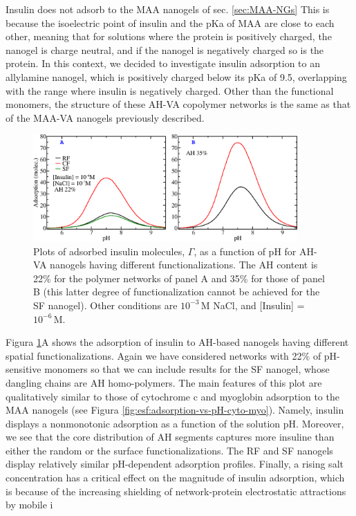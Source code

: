{Insulin does not adsorb to the MAA nanogels of sec.  \ref{sec:MAA-NGs} %
This is because the isoelectric point of insulin and the pKa of MAA are close to each other, meaning that for solutions where the protein is positively charged, the nanogel is charge neutral, and if the nanogel is negatively charged so is the protein.
In this context, we decided to investigate insulin adsorption to an allylamine nanogel, which is positively charged below its pKa of 9.5, overlapping with the range where insulin is negatively charged.
Other than the functional monomers, the structure of these AH-VA copolymer networks is the same as that of the MAA-VA nanogels previously described.



\begin{figure}[!htb]
    \centering
    \includegraphics[width=0.9\textwidth]{Figures/graphs-gel2/insu-PAH.png}
    \caption{Plots of adsorbed insulin molecules, $\Gamma$, as a function of pH for  AH-VA nanogels having different functionalizations.
    The AH content is 22\% for the polymer networks of panel A and 35\% for those of panel B (this latter degree of functionalization cannot be achieved for the SF nanogel).
    Other conditions are $10^{-3}$\,M NaCl, and [Insulin] = $10^{-6}$\,M.}
    \label{fig:esf:adsorption-vs-pH-insulin}
\end{figure}






Figura \ref{fig:esf:adsorption-vs-pH-insulin}A shows the adsorption of insulin to AH-based nanogels having different spatial functionalizations.
Again we have considered networks with 22\% of pH-sensitive monomers so that we can include results for the SF nanogel, whose dangling chains are AH homo-polymers.
The main features of this plot are qualitatively similar to those of cytochrome c and myoglobin adsorption to the MAA nanogels (see Figura \ref{fig:esf:adsorption-vs-pH-cyto-myo}).
Namely, insulin displays a  nonmonotonic adsorption as a function of the solution pH.
Moreover, we see that the core distribution of AH segments captures more insuline than either the random or the surface functionalizations.
The RF and SF nanogels display relatively similar pH-dependent adsorption profiles.
Finally, a rising salt concentration has a critical effect on the magnitude of insulin adsorption, which is because of the increasing shielding of network-protein electrostatic attractions by mobile i


}
